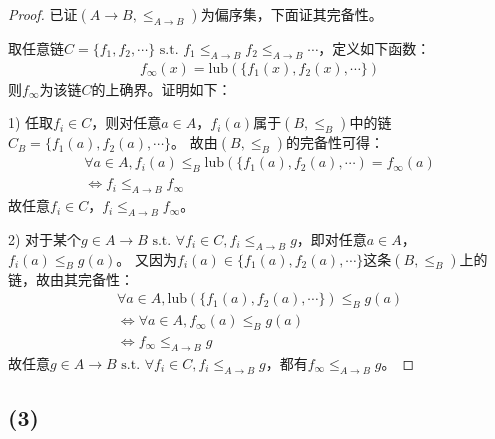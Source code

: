 \documentclass[12pt]{article}
\newcommand{\leqab}{\leq_{A \to B}}
\newcommand{\leqb}{\leq_B}
\newcommand{\st}{\textrm{ s.t. }}
\newcommand{\lub}{\textrm{lub}}
\begin{document}
    \begin{proof}
      已证$(A \to B, \leqab)$为偏序集，下面证其完备性。

      取任意链$C=\{f_1,f_2,\cdots\} \st f_1 \leqab f_2 \leqab \cdots$，定义如下函数：
      \begin{gather}
        f_\infty(x) = \lub(\{f_1(x), f_2(x), \cdots\})
      \end{gather}
      则$f_\infty$为该链$C$的上确界。证明如下：

      1) 任取$f_i \in C$，则对任意$a \in A$，$f_i(a)$属于$(B,\leqb)$中的链$C_B=\{f_1(a),f_2(a),\cdots\}$。
         故由$(B,\leqb)$的完备性可得：
         \begin{gather}
           \forall a \in A, f_i(a) \leqb \lub(\{f_1(a),f_2(a),\cdots) = f_\infty(a) \\
           \Leftrightarrow f_i \leqab f_\infty
         \end{gather}
         故任意$f_i \in C$，$f_i \leqab f_\infty$。

      2) 对于某个$g \in A \to B \st \forall f_i \in C, f_i \leqab g$，即对任意$a \in A$，$f_i(a) \leqb g(a)$。
         又因为$f_i(a) \in \{f_1(a),f_2(a),\cdots\}$这条$(B,\leqb)$上的链，故由其完备性：
         \begin{gather}
           \forall a \in A, \lub(\{f_1(a),f_2(a),\cdots\}) \leqb g(a) \\
           \Leftrightarrow \forall a \in A, f_\infty(a) \leqb g(a) \\
           \Leftrightarrow f_\infty \leqab g
         \end{gather}
         故任意$g \in A \to B \st \forall f_i \in C, f_i \leqab g$，都有$f_\infty \leqab g$。
    \end{proof}

  \subsection*{(3)}
\end{document}
